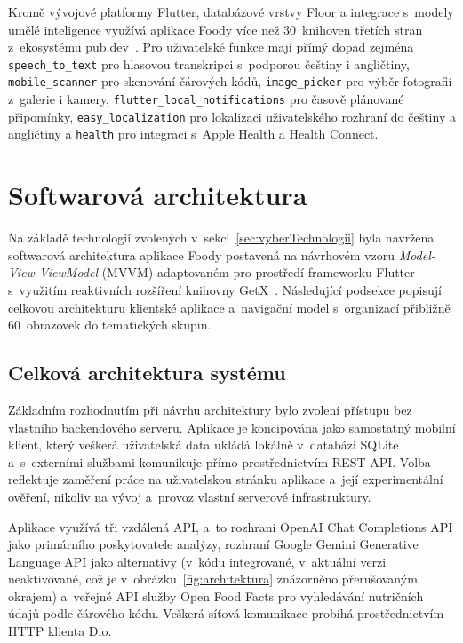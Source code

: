 Kromě vývojové platformy Flutter, databázové vrstvy Floor a integrace s~modely umělé inteligence využívá aplikace Foody více než 30~knihoven třetích stran z~ekosystému pub.dev~\cite{pubDev}.
Pro uživatelské funkce mají přímý dopad zejména \texttt{speech\_to\_text} pro hlasovou transkripci s~podporou češtiny i angličtiny, \texttt{mobile\_scanner} pro skenování čárových kódů, \texttt{image\_picker} pro výběr fotografií z~galerie i kamery, \texttt{flutter\_local\_notifications} pro časově plánované připomínky, \texttt{easy\_localization} pro lokalizaci uživatelského rozhraní do češtiny a angličtiny a \texttt{health} pro integraci s~Apple Health a Health Connect.

\section{Softwarová architektura}
\label{sec:softwarovaArchitektura}

Na základě technologií zvolených v~sekci~\ref{sec:vyberTechnologii} byla navržena softwarová architektura aplikace Foody postavená na návrhovém vzoru \emph{Model-View-ViewModel} (MVVM) adaptovaném pro prostředí frameworku Flutter s~využitím reaktivních rozšíření knihovny GetX~\cite{getxDoc}.
Následující podsekce popisují celkovou architekturu klientské aplikace a~navigační model s~organizací přibližně 60~obrazovek do tematických skupin.

\subsection{Celková architektura systému}
\label{subsec:celkovaArchitektura}

Základním rozhodnutím při návrhu architektury bylo zvolení přístupu bez vlastního backendového serveru.
Aplikace je koncipována jako samostatný mobilní klient, který veškerá uživatelská data ukládá lokálně v~databázi SQLite a~s~externími službami komunikuje přímo prostřednictvím REST API.
Volba reflektuje zaměření práce na uživatelskou stránku aplikace a~její experimentální ověření, nikoliv na vývoj a~provoz vlastní serverové infrastruktury.

Aplikace využívá tři vzdálená API, a~to rozhraní OpenAI Chat Completions API jako primárního poskytovatele analýzy, rozhraní Google Gemini Generative Language API jako alternativy (v~kódu integrované, v~aktuální verzi neaktivované, což je v~obrázku~\ref{fig:architektura} znázorněno přerušovaným okrajem) a~veřejné API služby Open Food Facts pro vyhledávání nutričních údajů podle čárového kódu.
Veškerá síťová komunikace probíhá prostřednictvím HTTP klienta Dio.

